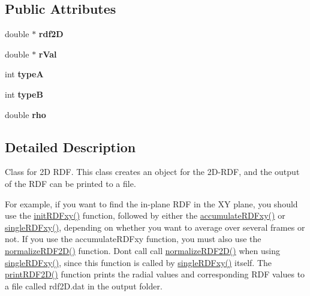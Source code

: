 \subsection*{Public Attributes}
\begin{DoxyCompactItemize}
\item 
\mbox{\label{classRdf2D_ad756caf75c389a69754105c70fb5db60}} 
double $\ast$ {\bfseries rdf2D}
\item 
\mbox{\label{classRdf2D_a3f7fdb2bb7ba36ff77f721c4abc8120a}} 
double $\ast$ {\bfseries r\+Val}
\item 
\mbox{\label{classRdf2D_a5720844aa069901d9e3b91a943af4ed8}} 
int {\bfseries typeA}
\item 
\mbox{\label{classRdf2D_ac4301eef0e368e8b67b6d03a152e0e8b}} 
int {\bfseries typeB}
\item 
\mbox{\label{classRdf2D_ac7beb9f69ee96e5c5ac692eca802a81b}} 
double {\bfseries rho}
\end{DoxyCompactItemize}


\subsection{Detailed Description}
Class for 2D R\+DF. This class creates an object for the 2D-\/\+R\+DF, and the output of the R\+DF can be printed to a file. 

For example, if you want to find the in-\/plane R\+DF in the XY plane, you should use the \mbox{\hyperlink{classRdf2D_a767f006de6412394a59f1cae5f7f6b35}{init\+R\+D\+Fxy()}} function, followed by either the \mbox{\hyperlink{classRdf2D_a6c716851d80fd2a7dcfefd219892d87b}{accumulate\+R\+D\+Fxy()}} or \mbox{\hyperlink{classRdf2D_afc5ff73aa9c126184e94ee3abfc14ff4}{single\+R\+D\+Fxy()}}, depending on whether you want to average over several frames or not. If you use the accumulate\+R\+D\+Fxy function, you must also use the \mbox{\hyperlink{classRdf2D_aaf6d00ec728e8c694ed2932332691c0d}{normalize\+R\+D\+F2\+D()}} function. Don\textquotesingle{}t call call \mbox{\hyperlink{classRdf2D_aaf6d00ec728e8c694ed2932332691c0d}{normalize\+R\+D\+F2\+D()}} when using \mbox{\hyperlink{classRdf2D_afc5ff73aa9c126184e94ee3abfc14ff4}{single\+R\+D\+Fxy()}}, since this function is called by \mbox{\hyperlink{classRdf2D_afc5ff73aa9c126184e94ee3abfc14ff4}{single\+R\+D\+Fxy()}} itself. The \mbox{\hyperlink{classRdf2D_aae00c1526117f6ac63d2c13354b6c404}{print\+R\+D\+F2\+D()}} function prints the radial values and corresponding R\+DF values to a file called rdf2\+D.\+dat in the output folder.


